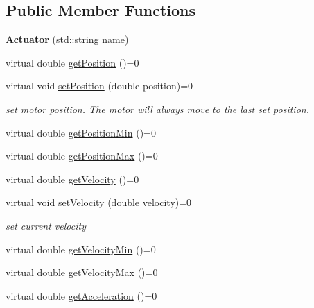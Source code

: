 \subsection*{Public Member Functions}
\begin{DoxyCompactItemize}
\item 
\hypertarget{classdrobot_1_1device_1_1actuator_1_1Actuator_ab13bc9a1bb826a403767e5af41558352}{{\bfseries Actuator} (std\-::string name)}\label{classdrobot_1_1device_1_1actuator_1_1Actuator_ab13bc9a1bb826a403767e5af41558352}

\item 
virtual double \hyperlink{classdrobot_1_1device_1_1actuator_1_1Actuator_aea525e325f2eb2058a37db3e014bb872}{get\-Position} ()=0
\item 
virtual void \hyperlink{classdrobot_1_1device_1_1actuator_1_1Actuator_a65fa025b3c0c69d81012454145c7ac69}{set\-Position} (double position)=0
\begin{DoxyCompactList}\small\item\em set motor position. The motor will always move to the last set position. \end{DoxyCompactList}\item 
virtual double \hyperlink{classdrobot_1_1device_1_1actuator_1_1Actuator_a7a4c195442470d46275f62446e5d2535}{get\-Position\-Min} ()=0
\item 
virtual double \hyperlink{classdrobot_1_1device_1_1actuator_1_1Actuator_a3a02ed0a72f8ab360748df0d9872eeb3}{get\-Position\-Max} ()=0
\item 
virtual double \hyperlink{classdrobot_1_1device_1_1actuator_1_1Actuator_a9fea4e618e465cbcc9a207740dbc5410}{get\-Velocity} ()=0
\item 
virtual void \hyperlink{classdrobot_1_1device_1_1actuator_1_1Actuator_a452a63a9cf5daf479c12b99c3e99679c}{set\-Velocity} (double velocity)=0
\begin{DoxyCompactList}\small\item\em set current velocity \end{DoxyCompactList}\item 
virtual double \hyperlink{classdrobot_1_1device_1_1actuator_1_1Actuator_a3ddbc25d10ca91b0719ad8b3b6220948}{get\-Velocity\-Min} ()=0
\item 
virtual double \hyperlink{classdrobot_1_1device_1_1actuator_1_1Actuator_a5a018f4e240fb1a483307c03a7662f3d}{get\-Velocity\-Max} ()=0
\item 
virtual double \hyperlink{classdrobot_1_1device_1_1actuator_1_1Actuator_a9dd6e74032417e5a84946925c655047c}{get\-Acceleration} ()=0

\end{DoxyCompactItemize}
